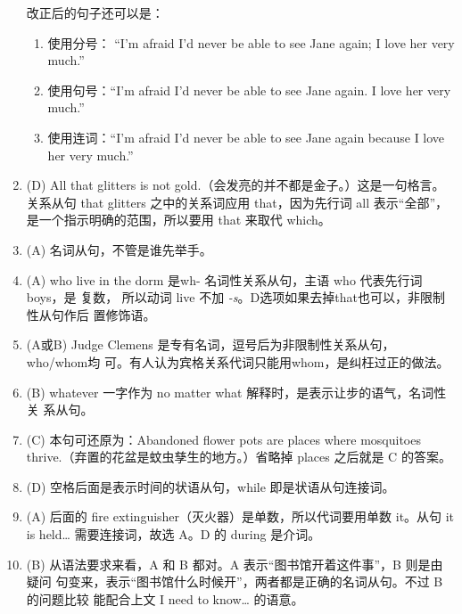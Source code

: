 \begin{enumerate}
{    改正后的句子还可以是：
    \begin{enumerate}

    \item 使用分号： “I'm afraid I'd never be able to see Jane again; I love
      her very much.”
    \item 使用句号：“I'm afraid I'd never be able to see Jane again. I love
      her very much.”
    \item 使用连词：“I'm afraid I'd never be able to see Jane again because I
      love her very much.”
    \end{enumerate}
  }

\item (D) All that glitters is not gold.（会发亮的并不都是金子。）这是一句格言。
  关系从句 that glitters 之中的关系词应用 that，因为先行词 all 表示“全部”，
  是一个指示明确的范围，所以要用 that 来取代 which。

\item (A) 名词从句，不管是谁先举手。

\item (A) who live in the dorm 是wh- 名词性关系从句，主语 who 代表先行词 boys，是
  复数， 所以动词 live 不加 \emph{-s}。D选项如果去掉that也可以，非限制性从句作后
  置修饰语。

\item (A或B) Judge Clemens 是专有名词，逗号后为非限制性关系从句，who/whom均
  可。有人认为宾格关系代词只能用whom，是纠枉过正的做法。

\item (B) whatever 一字作为 no matter what 解释时，是表示让步的语气，名词性关
  系从句。

\item (C) 本句可还原为：Abandoned flower pots are places where mosquitoes thrive.（弃置的花盆是蚊虫孳生的地方。）省略掉 places 之后就是 C 的答案。


\item (D) 空格后面是表示时间的状语从句，while 即是状语从句连接词。

\item  (A) 后面的 fire extinguisher（灭火器）是单数，所以代词要用单数 it。从句 it is held… 需要连接词，故选 A。D 的 during 是介词。

\item (B) 从语法要求来看，A 和 B 都对。A 表示“图书馆开着这件事”，B 则是由疑问
  句变来，表示“图书馆什么时候开”，两者都是正确的名词从句。不过 B 的问题比较
  能配合上文 I need to know… 的语意。
\end{enumerate}

